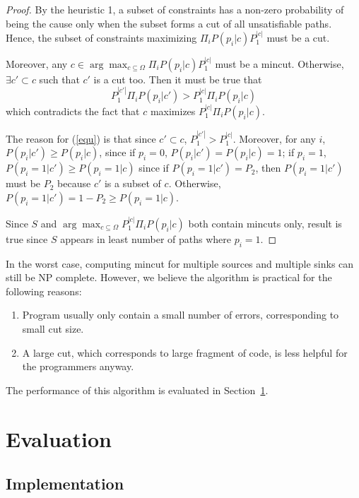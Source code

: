\begin{proof}
By the heuristic 1, a subset of constraints has a non-zero probability of being
the cause only when the subset forms a cut of all unsatisfiable paths. Hence,
the subset of constraints maximizing $\Pi_i P(p_i|c) P_1^{|c|}$ must be a cut.

Moreover, any $c\in \arg\max_{c\subseteq \Omega}\Pi_i P(p_i|c) P_1^{|c|}$ must
be a mincut. Otherwise, $\exists c'\subset c$ such that $c'$ is a cut too. Then
it must be true that 
\begin{equation}
\label{equ}
P_1^{|c'|} \Pi_i P(p_i|c') > P_1^{|c|} \Pi_i P(p_i|c)
\end{equation}
which contradicts the fact that $c$ maximizes $P_1^{|c|} \Pi_i P(p_i|c)$.

The reason for (\ref{equ}) is that since $c'\subset c$, $P_1^{|c'|}>
P_1^{|c|}$. Moreover, for any $i$,  $P(p_i|c') \geq P(p_i|c)$, since if
$p_i=0$, $P(p_i|c')=P(p_i|c)=1$; if $p_i=1$, $P(p_i=1|c')\geq P(p_i=1|c)$ since
if $P(p_i=1|c')=P_2$, then $P(p_i=1|c')$ must be $P_2$ because $c'$ is a subset
of $c$.  Otherwise, $P(p_i=1|c')=1-P_2\geq P(p_i=1|c)$.

Since $S$ and $\arg\max_{c\subseteq \Omega}P_1^{|c|} \Pi_i P(p_i|c)$ both
contain mincuts only, result is true since $S$ appears in least number of paths
where $p_i=1$.
\end{proof}

In the worst case, computing mincut for multiple sources and multiple sinks can
still be NP complete. However, we believe the algorithm is practical for the
following reasons:
\begin{enumerate}
\item Program usually only contain a small number of errors, corresponding to
small cut size.

\item A large cut, which corresponds to large fragment of code, is less helpful
for the programmers anyway.
\end{enumerate}

The performance of this algorithm is evaluated in Section~\ref{sec:evaluation}.

\section{Evaluation}
\label{sec:evaluation}

\subsection{Implementation}

